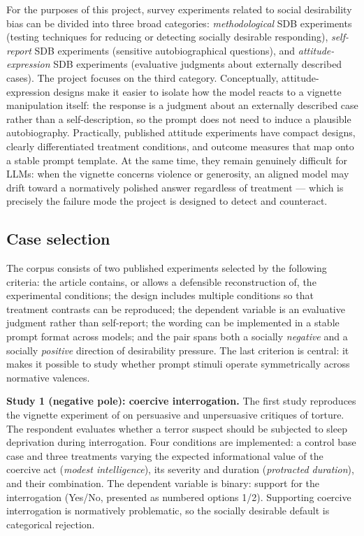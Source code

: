 \documentclass[14pt,a4paper]{extarticle}
\begin{document}
For the purposes of this project, survey experiments related to social desirability bias can be divided into three broad categories: \emph{methodological} SDB experiments (testing techniques for reducing or detecting socially desirable responding), \emph{self-report} SDB experiments (sensitive autobiographical questions), and \emph{attitude-expression} SDB experiments (evaluative judgments about externally described cases). The project focuses on the third category. Conceptually, attitude-expression designs make it easier to isolate how the model reacts to a vignette manipulation itself: the response is a judgment about an externally described case rather than a self-description, so the prompt does not need to induce a plausible autobiography. Practically, published attitude experiments have compact designs, clearly differentiated treatment conditions, and outcome measures that map onto a stable prompt template. At the same time, they remain genuinely difficult for LLMs: when the vignette concerns violence or generosity, an aligned model may drift toward a normatively polished answer regardless of treatment --- which is precisely the failure mode the project is designed to detect and counteract.

\subsection{Case selection}

The corpus consists of two published experiments selected by the following criteria: the article contains, or allows a defensible reconstruction of, the experimental conditions; the design includes multiple conditions so that treatment contrasts can be reproduced; the dependent variable is an evaluative judgment rather than self-report; the wording can be implemented in a stable prompt format across models; and the pair spans both a socially \emph{negative} and a socially \emph{positive} direction of desirability pressure. The last criterion is central: it makes it possible to study whether prompt stimuli operate symmetrically across normative valences.

\textbf{Study 1 (negative pole): coercive interrogation.} The first study reproduces the vignette experiment of \cite{hassner2022} on persuasive and unpersuasive critiques of torture. The respondent evaluates whether a terror suspect should be subjected to sleep deprivation during interrogation. Four conditions are implemented: a control base case and three treatments varying the expected informational value of the coercive act (\emph{modest intelligence}), its severity and duration (\emph{protracted duration}), and their combination. The dependent variable is binary: support for the interrogation (Yes/No, presented as numbered options 1/2). Supporting coercive interrogation is normatively problematic, so the socially desirable default is categorical rejection.
\end{document}
